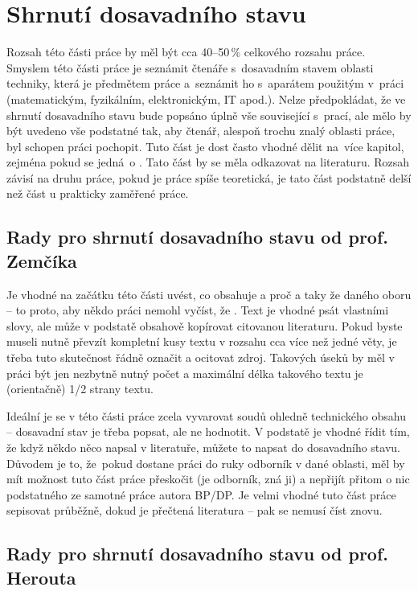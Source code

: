 \section{Shrnutí dosavadního stavu}
\label{stav}

Rozsah této části práce by měl být cca 40--50\,\% celkového rozsahu práce. Smyslem této části práce je seznámit čtenáře s~dosavadním stavem oblasti techniky, která je předmětem práce a~seznámit ho s~aparátem použitým v~práci (matematickým, fyzikálním, elektronickým, IT apod.). Nelze předpokládat, že ve shrnutí dosavadního stavu bude popsáno úplně vše související s~prací, ale mělo by být uvedeno vše podstatné tak, aby čtenář, alespoň trochu znalý oblasti práce, byl schopen práci pochopit. Tuto část je dost často vhodné dělit na~více kapitol, zejména pokud se jedná~o . Tato část by se měla  odkazovat na literaturu. Rozsah závisí na druhu práce, pokud je práce spíše teoretická, je tato část podstatně delší než část u prakticky zaměřené práce.

\subsection*{Rady pro shrnutí dosavadního stavu od prof. Zemčíka}

Je vhodné na začátku této části uvést, co obsahuje a proč a taky že  daného oboru -- to proto, aby někdo práci nemohl vyčíst, že . Text je vhodné psát vlastními slovy, ale může v podstatě obsahově kopírovat citovanou literaturu. Pokud byste museli nutně převzít kompletní kusy textu v rozsahu cca více než jedné věty, je třeba tuto skutečnost řádně označit a ocitovat zdroj. Takových úseků by měl v práci být jen nezbytně nutný počet a maximální délka takového textu je (orientačně) 1/2 strany textu.

Ideální je se v této části práce zcela vyvarovat soudů ohledně technického obsahu -- dosavadní stav je třeba popsat, ale ne hodnotit. V podstatě je vhodné řídit tím, že když někdo něco napsal v literatuře, můžete to napsat do dosavadního stavu. Důvodem je to, že~pokud dostane práci do ruky odborník v dané oblasti, měl by mít možnost tuto část práce přeskočit (je odborník, zná ji) a nepřijít přitom o nic podstatného ze samotné práce autora BP/DP. Je velmi vhodné tuto část práce sepisovat průběžně, dokud je přečtená literatura  -- pak se nemusí číst znovu.


\subsection*{Rady pro shrnutí dosavadního stavu od prof. Herouta}

